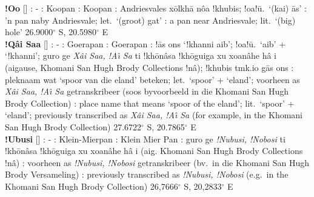 \textbf{!Oo} [] : - :
Koopan : Koopan : Andriesvales
x\={o}lkh\={a} \textdoublebarpipe{}n\^{o}a !khubis; !oa!\={u}.\ `(kai)
\={a}s' : 'n pan naby Andriesvale; let.\ `(groot) gat'
: a pan near Andriesvale; lit.\ `(big) hole'
26.9000$^{\circ}$ S, 20.5980$^{\circ}$ E \\

\textbf{!Q\^{a}i Saa} [] : -
: Goerapan : Goerapan :
!\={a}s \textvertline{}ons `!khanni \textdoublebarpipe{}aib';
!oa!\={u}.\ `\textdoublebarpipe{}aib' + `!khanni';
\textdoublebarpipe{}guro ge \emph{\textdoublebarpipe{}X\^{a}i Saa,
!A\^{\i} Sa} ti !kh\={o}\textdoublevertline{}n\^{a}sa
!kh\={o}\textdoublevertline{}guiga xu xoa\textdoublevertline{}n\^{a}he
h\^{a} i (ai\textdoublevertline{}gause, \textdoublebarpipe{}Khomani
San Hugh Brody Collections !n\^{a}); !khubis tmk.io
\textdoublebarpipe{}g\={a}s \textvertline{}ons :
pleknaam wat `spoor van die eland' beteken; let.\ `spoor' + `eland';
voorheen as \emph{\textdoublebarpipe{}X\^{a}i Saa, !A\^{\i} Sa}
getranskribeer (soos byvoorbeeld in die \textdoublebarpipe{}Khomani
San Hugh Brody Collection) : place name that means
`spoor of the eland'; lit.\ `spoor' + `eland'; previously transcribed
as \emph{\textdoublebarpipe{}X\^{a}i Saa, !A\^{\i} Sa} (for example,
in the \textdoublebarpipe{}Khomani San Hugh Brody Collection)
27.6722$^{\circ}$ S, 20.7865$^{\circ}$ E \\

\textbf{!Ubusi} [] : - :
Klein-Mierpan : Klein Mier Pan :
\textdoublebarpipe{}guro ge \emph{!Nubusi, !Nobosi} ti
!kh\={o}\textdoublevertline{}n\^{a}sa
!kh\={o}\textdoublevertline{}guiga xu xoa\textdoublevertline{}n\^{a}he
h\^{a} i (ai\textdoublevertline{}g. \textdoublebarpipe{}Khomani San
Hugh Brody Collections !n\^{a}) : voorheen as
\emph{!Nubusi, !Nobosi} getranskribeer (bv.\ in die
\textdoublebarpipe{}Khomani San Hugh Brody Versameling)
: previously transcribed as \emph{!Nubusi, !Nobosi}
(e.g.\ in the \textdoublebarpipe{}Khomani San Hugh Brody Collection)
26,7666$^{\circ}$ S, 20,2833$^{\circ}$ E \\

